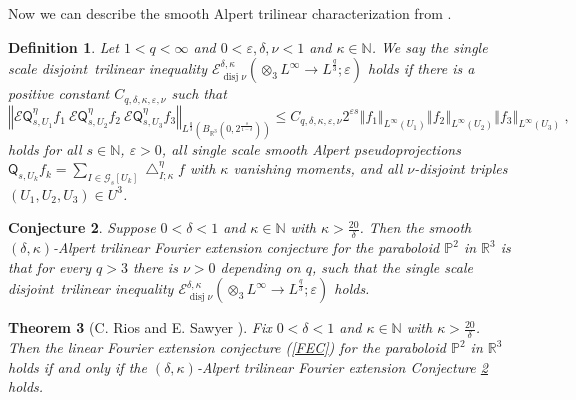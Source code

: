\documentclass{amsart}%
\newtheorem{theorem}{Theorem}
\theoremstyle{plain}
\newtheorem{conjecture}[theorem]{Conjecture}
\newtheorem{definition}[theorem]{Definition}
\numberwithin{equation}{section}
\begin{document}
Now we can describe the smooth Alpert trilinear characterization from
\cite{RiSa3}.

\begin{definition}
Let $1<q<\infty$ and $0<\varepsilon,\delta,\nu<1$ and $\kappa\in\mathbb{N}$.
We say the single scale disjoint\emph{\ }trilinear inequality $\mathcal{E}%
_{\operatorname*{disj}\nu}^{\delta,\kappa}\left(  \otimes_{3}L^{\infty
}\rightarrow L^{\frac{q}{3}};\varepsilon\right)  $ holds if there is a
positive constant $C_{q,\delta,\kappa,\varepsilon,\nu}$ such that%
\[
\left\Vert \mathcal{E}\mathsf{Q}_{s,U_{1}}^{\eta}f_{1}\ \mathcal{E}%
\mathsf{Q}_{s,U_{2}}^{\eta}f_{2}\ \mathcal{E}\mathsf{Q}_{s,U_{3}}^{\eta}%
f_{3}\right\Vert _{L^{\frac{q}{3}}\left(  B_{\mathbb{R}^{3}}\left(
0,2^{\frac{s}{1-\delta}}\right)  \right)  }\leq C_{q,\delta,\kappa
,\varepsilon,\nu}2^{\varepsilon s}\left\Vert f_{1}\right\Vert _{L^{\infty
}\left(  U_{1}\right)  }\left\Vert f_{2}\right\Vert _{L^{\infty}\left(
U_{2}\right)  }\left\Vert f_{3}\right\Vert _{L^{\infty}\left(  U_{3}\right)
}\ ,
\]
holds for all $s\in\mathbb{N}$, $\varepsilon>0$, all single scale smooth
Alpert pseudoprojections $\mathsf{Q}_{s,U_{k}}f_{k}=\sum_{I\in\mathcal{G}%
_{s}\left[  U_{k}\right]  }\bigtriangleup_{I;\kappa}^{\eta}f$ with $\kappa$
vanishing moments, and all $\nu$-disjoint triples $\left(  U_{1},U_{2}%
,U_{3}\right)  \in U^{3}$.
\end{definition}

\begin{conjecture}
\label{tFec}Suppose $0<\delta<1$ and $\kappa\in\mathbb{N}$ with $\kappa
>\frac{20}{\delta}$. Then the smooth $\left(  \delta,\kappa\right)  $-Alpert
trilinear Fourier extension conjecture for the paraboloid $\mathbb{P}^{2}$ in
$\mathbb{R}^{3}$ is that for every $q>3$ there is $\nu>0$ depending on $q $,
such that the single scale disjoint\emph{\ }trilinear inequality
$\mathcal{E}_{\operatorname*{disj}\nu}^{\delta,\kappa}\left(  \otimes
_{3}L^{\infty}\rightarrow L^{\frac{q}{3}};\varepsilon\right)  $ holds.
\end{conjecture}

\begin{theorem}
[C. Rios and E. Sawyer \cite{RiSa2}]\label{single main Alpert}Fix $0<\delta<1$
and $\kappa\in\mathbb{N}$ with $\kappa>\frac{20}{\delta}$. Then the linear
Fourier extension conjecture (\ref{FEC}) for the paraboloid $\mathbb{P}^{2}$
in $\mathbb{R}^{3}$ holds \emph{if and only if} the $\left(  \delta
,\kappa\right)  $-Alpert trilinear Fourier extension Conjecture \ref{tFec} holds.
\end{theorem}
\end{document}

